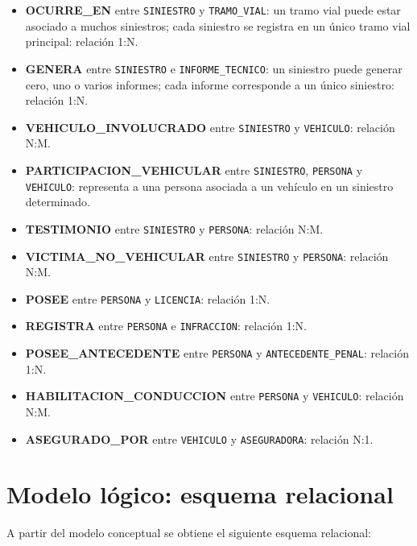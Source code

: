 \documentclass[12pt,a4paper]{article}
\begin{document}
\begin{itemize}[leftmargin=*]
    \item \textbf{OCURRE\_EN} entre \texttt{SINIESTRO} y \texttt{TRAMO\_VIAL}: un tramo vial puede estar asociado a muchos siniestros; cada siniestro se registra en un único tramo vial principal: relación 1:N.   
    \item \textbf{GENERA} entre \texttt{SINIESTRO} e \texttt{INFORME\_TECNICO}: un siniestro puede generar cero, uno o varios informes; cada informe corresponde a un único siniestro: relación 1:N.
    \item \textbf{VEHICULO\_INVOLUCRADO} entre \texttt{SINIESTRO} y \texttt{VEHICULO}: relación N:M.
    \item \textbf{PARTICIPACION\_VEHICULAR} entre \texttt{SINIESTRO}, \texttt{PERSONA} y \texttt{VEHICULO}: representa a una persona asociada a un vehículo en un siniestro determinado.
    \item \textbf{TESTIMONIO} entre \texttt{SINIESTRO} y \texttt{PERSONA}: relación N:M.
    \item \textbf{VICTIMA\_NO\_VEHICULAR} entre \texttt{SINIESTRO} y \texttt{PERSONA}: relación N:M.
    \item \textbf{POSEE} entre \texttt{PERSONA} y \texttt{LICENCIA}: relación 1:N.
    \item \textbf{REGISTRA} entre \texttt{PERSONA} e \texttt{INFRACCION}: relación 1:N.
    \item \textbf{POSEE\_ANTECEDENTE} entre \texttt{PERSONA} y \texttt{ANTECEDENTE\_PENAL}: relación 1:N.
    \item \textbf{HABILITACION\_CONDUCCION} entre \texttt{PERSONA} y \texttt{VEHICULO}: relación N:M.
    \item \textbf{ASEGURADO\_POR} entre \texttt{VEHICULO} y \texttt{ASEGURADORA}: relación N:1.
\end{itemize}

\section{Modelo lógico: esquema relacional}

A partir del modelo conceptual se obtiene el siguiente esquema relacional:
\end{document}
